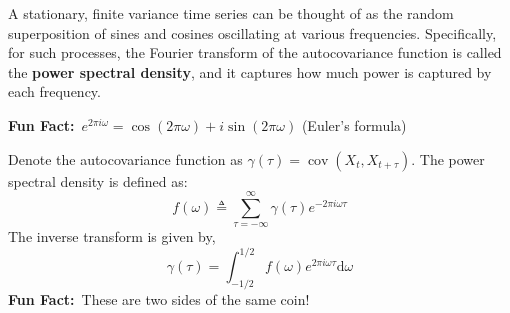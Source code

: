 \documentclass[letterpaper,11pt]{exam}
\DeclareMathOperator*{\cov}{cov}
\newcounter{homework}
\newcommand{\homework}{\stepcounter{homework}\textcolor{violet}{\textbf{Homework \thehomework:}~}}
\newcommand{\funfact}{\textbf{Fun Fact:}~}
\begin{document}
\begin{questions}
\newpage

\question
A stationary, finite variance time series can be thought of as the random superposition of sines and cosines oscillating at various frequencies.
Specifically, for such processes, the Fourier transform of the autocovariance function is called the \textbf{power spectral density}, and it captures how much power is captured by each frequency.
\begin{tcolorbox}
    \funfact $e^{2\pi i \omega} = \cos(2\pi\omega) + i \sin(2\pi\omega)$
    (Euler's formula)
\end{tcolorbox}
\begin{tcolorbox}
    Denote the autocovariance function as $\gamma(\tau) = \cov(X_t, X_{t+\tau})$.
    The power spectral density is defined as:
    \begin{equation}\label{eq:psd:acov}
	f(\omega) \triangleq \sum_{\tau=-\infty}^{\infty} \gamma(\tau) e^{-2\pi i \omega \tau}
    \end{equation}
    The inverse transform is given by,
    \begin{equation}\label{eq:psd:acov:inv}
	\gamma(\tau) = \int_{-1/2}^{1/2} f(\omega) e^{2\pi i \omega \tau} \mathrm{d}\omega
    \end{equation}
    \funfact These are two sides of the same coin!
\end{tcolorbox}
\end{questions}
\end{document}
